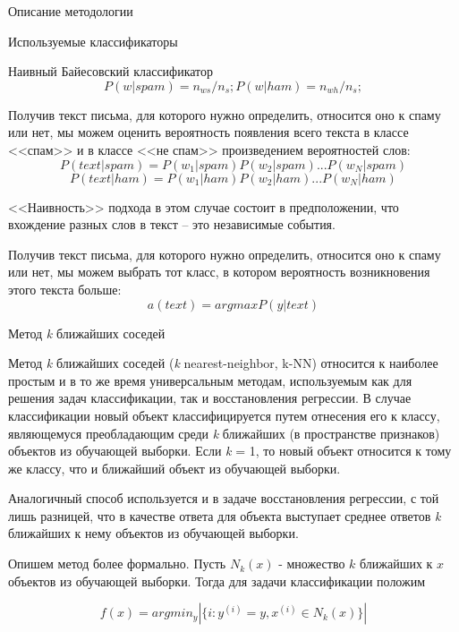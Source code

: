\begin{section}{Описание методологии}
\begin{subsection}{Используемые классификаторы}
\begin{subsubsection}{Наивный Байесовский классификатор}
\begin{equation}
  P(w|spam) = n_{ws}/n_s; P(w|ham) = n_{wh}/n_s;
\end{equation}

Получив текст письма, для которого нужно определить, относится оно к спаму или нет, мы можем оценить вероятность появления всего текста в классе <<спам>> и в классе <<не спам>> произведением вероятностей слов:
\begin{equation}
P(text|spam) = P(w_1|spam)P(w_2|spam)...P(w_N|spam)
\end{equation}
\begin{equation}
P(text|ham) = P(w_1|ham)P(w_2|ham)...P(w_N|ham)
\end{equation}

<<Наивность>> подхода в этом случае состоит в предположении, что вхождение разных слов в текст – это независимые события.

Получив текст письма, для которого нужно определить, относится оно к спаму или нет, мы можем выбрать тот класс, в котором вероятность возникновения этого текста больше:
\begin{equation}
a(text) = argmax P(y|text)
\end{equation}
\end{subsubsection}

    \begin{subsubsection}{Метод \textit{k} ближайших соседей}

      Метод \textit{k} ближайших соседей (\textit{k} nearest-neighbor, k-NN) относится к наиболее простым и в то же время универсальным методам, используемым как для решения задач классификации, так и восстановления регрессии. В случае классификации новый объект классифицируется путем отнесения его к классу, являющемуся преобладающим среди \textit{k} ближайших (в пространстве признаков) объектов из обучающей выборки. Если \textit{k} = 1, то новый объект относится к тому же классу, что и ближайший объект из обучающей выборки.

      Аналогичный способ используется и в задаче восстановления регрессии, с той лишь разницей, что в качестве ответа для объекта выступает среднее ответов \textit{k} ближайших к нему объектов из обучающей выборки.

      Опишем метод более формально. Пусть $N_k(x)$ - множество $k$ ближайших к $x$ объектов из обучающей выборки. Тогда для задачи классификации положим

      \begin{equation}
        f(x)=arg⁡min_{y}⁡|\{i\colon y^{(i)}=y, x^{(i)} \in N_k (x)\}|
      \end{equation}


\end{subsubsection}
\end{subsection}
\end{section}
